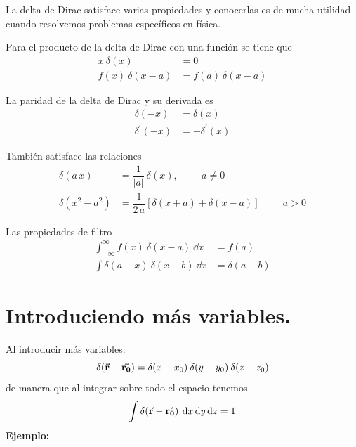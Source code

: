 \documentclass[12pt]{beamer}
\begin{document}
La delta de Dirac satisface varias propiedades y conocerlas es de mucha utilidad cuando resolvemos problemas específicos en física. 
\par
\begin{propiedad}
Para el producto de la delta de Dirac con una función se tiene que
\begin{align}
x \: \delta(x) &= 0 \\
f(x) \: \delta(x - a) &= f(a) \: \delta(x - a)
\end{align}
\end{propiedad}
\begin{propiedad}
La paridad de la delta de Dirac y su derivada es
\begin{align}
\delta (-x) &= \delta (x) \\
\delta^{\prime} (-x) &= - \delta^{\prime} (x)
\end{align}
\end{propiedad}
\begin{propiedad}
También satisface las relaciones
\begin{align}
\delta(a \, x) &= \dfrac{1}{\vert a \vert} \: \delta (x), \hspace{1cm} a \neq 0 \\
\delta (x^{2} - a^{2}) &= \dfrac{1}{2 \, a} \left[ \delta (x + a) + \delta (x - a) \right] \hspace{1cm} a > 0
\end{align}
\end{propiedad}
\begin{propiedad}
Las propiedades de filtro
\begin{align}
\int_{-\infty}^{\infty} f(x) \: \delta (x - a) \: \dd{x} &= f(a) \\
\int \delta (a - x) \: \delta (x - b) \: \dd{x} &= \delta (a - b)
\end{align}
\end{propiedad}

\section{Introduciendo más variables.}

Al introducir más variables:
\begin{equation}
\delta (\va{\bm{r}} - \va{\bm{r_{0}}}) = \delta (x - x_{0}) \: \delta (y - y_{0}) \: \delta (z - z_{0})
\label{eq:ecuacion_A_03}
\end{equation}
de manera que al integrar sobre todo el espacio tenemos
\[ \int \delta (\va{\bm{r}} - \va{\bm{r_{0}}}) \: \dd{x} \dd{y}  \dd{z} = 1 \]
\textbf{Ejemplo:}
\end{document}
